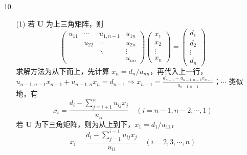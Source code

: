 \documentclass{sjtuarticle}
\begin{document}
\begin{itemize}
\begin{proof}
        \paragraph{结论} 根据数学归纳法原理，可以得到 $\bm{A}$ 的 Crout 分解。
    \end{proof}

    \item[10.] \begin{solution}
        \begin{itemize}
            \item[(1)] 若 $\bm{U}$ 为上三角矩阵，则
            \begin{equation*}
                \begin{pmatrix}
                    u_{11} & \cdots & u_{1,n-1} & u_{1n} \\
                      & u_{22} & \cdots & u_{2n} \\
                      &   &  \ddots & \vdots \\
                      &   &         & u_{nn}
                \end{pmatrix}
                \begin{pmatrix}
                    x_1\\x_2\\ \vdots \\ x_n
                \end{pmatrix}
                =
                \begin{pmatrix}
                    d_1\\d_2\\ \vdots \\ d_n
                \end{pmatrix}
            \end{equation*}
            求解方法为从下而上，先计算 $x_n=d_n/u_{nn}$，再代入上一行，$u_{n-1,n-1}x_{n-1}+u_{n-1,n}x_{n}=d_{n-1}\Rightarrow x_{n-1}=\frac{d_{n-1}-u_{n-1,n-1}x_{n-1}}{u_{n-1,n-1}}$；$\cdots$ 类似地，有
            \begin{equation*}
                x_{i}=\frac{d_{i}-\sum_{j=i+1}^{n}u_{ij}x_j}{u_{ii}}\quad (i=n-1,n-2,\cdots,1)
            \end{equation*}
            若 $\bm{U}$ 为下三角矩阵，则为从上到下，$x_1=d_1/u_{11}$，
            \begin{equation*}
                x_{i}=\frac{d_i-\sum_{j=1}^{i-1}u_{ij}x_j}{u_{ii}}\quad (i=2,3,\cdots,n)
            \end{equation*}


\end{itemize}
\end{solution}
\end{itemize}
\end{document}
